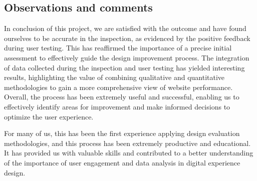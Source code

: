 
\subsection{Observations and comments}
In conclusion of this project, we are satisfied with the outcome and have found ourselves to be accurate in the inspection, as evidenced by the positive feedback during user testing. This has reaffirmed the importance of a precise initial assessment to effectively guide the design improvement process. The integration of data collected during the inspection and user testing has yielded interesting results, highlighting the value of combining qualitative and quantitative methodologies to gain a more comprehensive view of website performance. Overall, the process has been extremely useful and successful, enabling us to effectively identify areas for improvement and make informed decisions to optimize the user experience. 

For many of us, this has been the first experience applying design evaluation methodologies, and this process has been extremely productive and educational. It has provided us with valuable skills and contributed to a better understanding of the importance of user engagement and data analysis in digital experience design.
